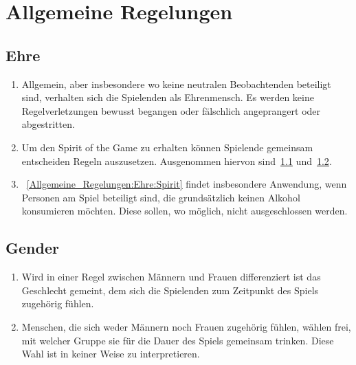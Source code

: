 \chapter{Allgemeine Regelungen}\label{Allgemeine_Regelungen}

\section{Ehre}\label{Allgemeine_Regelungen:Ehre}
\begin{enumerate}[label={(\arabic*)}]
	\item Allgemein, aber insbesondere wo keine neutralen Beobachtenden beteiligt sind, verhalten sich die Spielenden als Ehrenmensch.
	Es werden keine Regelverletzungen bewusst begangen oder fälschlich angeprangert oder abgestritten.
	
	\item\label{Allgemeine_Regelungen:Ehre:Spirit}
	Um den Spirit of the Game\grqq{} zu erhalten können Spielende gemeinsam entscheiden Regeln auszusetzen.
	Ausgenommen hiervon sind~\ref{Allgemeine_Regelungen:Ehre} und~\ref{Allgemeine_Regelungen:Gender}.
	
	\item
~\ref{Allgemeine_Regelungen:Ehre:Spirit} findet insbesondere Anwendung, wenn Personen am Spiel beteiligt sind, die grundsätzlich keinen Alkohol konsumieren möchten.
	Diese sollen, wo möglich, nicht ausgeschlossen werden.
\end{enumerate}

\section{Gender}\label{Allgemeine_Regelungen:Gender}
\begin{enumerate}[label={(\arabic*)}]	
	\item
	Wird in einer Regel zwischen Männern und Frauen differenziert ist das Geschlecht gemeint, dem sich die Spielenden zum Zeitpunkt des Spiels zugehörig fühlen.
	
	\item
	Menschen, die sich weder Männern noch Frauen zugehörig fühlen, wählen frei, mit welcher Gruppe sie für die Dauer des Spiels gemeinsam trinken.
	Diese Wahl ist in keiner Weise zu interpretieren.
\end{enumerate}
	
